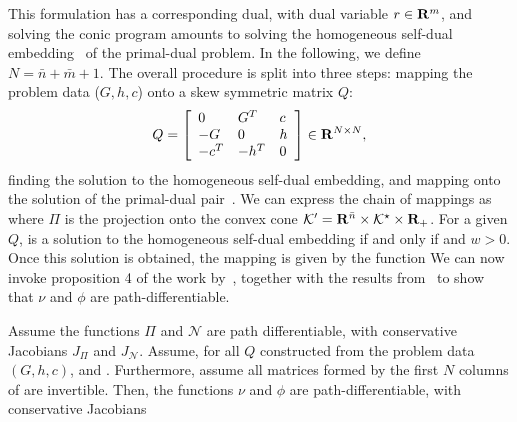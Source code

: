 This formulation has a corresponding dual, with dual variable $r \in {\mathbf R}^{m}$, and solving the conic program amounts to solving the homogeneous self-dual embedding~\citep{cones-hist}
of the primal-dual problem. 
In the following, we define $N = \bar{n} +  \bar{m} + 1$. The overall procedure is split into three steps: mapping the problem data ($G,h,c$) onto a skew symmetric matrix $Q$:
$$Q =  
\left[\begin{array}{lll} 0 & G^T & c\\
	-G & 0 & h \\
-c^T & -h^T & 0\end{array} \right] \in {\mathbf R}^{N\times N},$$
finding the solution  to the homogeneous self-dual embedding, and mapping  onto the solution of the primal-dual pair~\citep{diffcp2019}. We can express the chain of mappings as 
where $\Pi$ is the projection onto the convex cone $\mathcal{K}' = {\mathbf R}^{\bar{n}} \times \mathcal{K}^\star \times {\mathbf R}_+$.
For a given $Q$,  is a solution to the homogeneous self-dual embedding if and only if  and $w> 0$.
Once this solution is obtained, the mapping is given by the function 
We can now invoke proposition 4 of the work by~\cite{path-diff}, together with the results from~\cite{diffcp2019} to show that $\nu$ and $\phi$ are path-differentiable. 
\begin{proposition}
    Assume the functions $\Pi$ and $\mathcal{N}$ are path differentiable, with conservative Jacobians $J_\Pi$ and $J_\mathcal{N}$.  Assume, for all $Q$ constructed from the problem data $(G,h,c)$, and . Furthermore, assume all matrices formed by the first $N$ columns of  are invertible. Then, the functions $\nu$ and $\phi$ are path-differentiable, with conservative Jacobians
\vspace{-1em}
\end{proposition}
